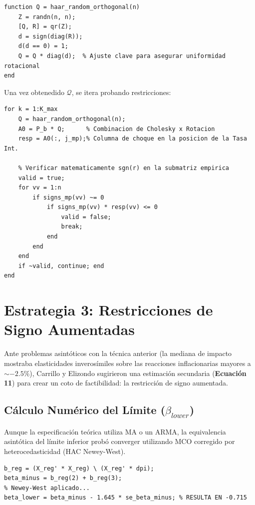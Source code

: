 \documentclass[11pt,a4paper]{article}
\begin{document}
\begin{lstlisting}[caption={Función de Generación bajo Medida de Haar}]
function Q = haar_random_orthogonal(n)
    Z = randn(n, n);
    [Q, R] = qr(Z);
    d = sign(diag(R));
    d(d == 0) = 1;
    Q = Q * diag(d);  % Ajuste clave para asegurar uniformidad rotacional
end
\end{lstlisting}

Una vez obtenedido $\mathcal{Q}$, se itera probando restricciones:

\begin{lstlisting}[caption={Restricción Lógica de Signos (Algoritmo 1 - Paso 5)}]
for k = 1:K_max
    Q = haar_random_orthogonal(n);
    A0 = P_b * Q;      % Combinacion de Cholesky x Rotacion
    resp = A0(:, j_mp);% Columna de choque en la posicion de la Tasa Int.
    
    % Verificar matematicamente sgn(r) en la submatriz empirica
    valid = true;
    for vv = 1:n
        if signs_mp(vv) ~= 0
            if signs_mp(vv) * resp(vv) <= 0
                valid = false;
                break;
            end
        end
    end
    if ~valid, continue; end
end
\end{lstlisting}

\section{Estrategia 3: Restricciones de Signo Aumentadas}
Ante problemas asintóticos con la técnica anterior (la mediana de impacto mostraba elasticidades inverosímiles sobre las reacciones inflacionarias mayores a $\sim -2.5\%$), Carrillo y Elizondo sugirieron una estimación secundaria (\textbf{Ecuación 11}) para crear un coto de factibilidad: la restricción de signo aumentada.

\subsection{Cálculo Numérico del Límite ($\beta_{lower}$)}
Aunque la especificación teórica utiliza MA o un ARMA, la equivalencia asintótica del límite inferior probó converger utilizando MCO corregido por heterocedasticidad (HAC Newey-West).

\begin{lstlisting}[caption={Evolución empírica del límite}]
% Estimacion del limite en MATLAB
b_reg = (X_reg' * X_reg) \ (X_reg' * dpi);
beta_minus = b_reg(2) + b_reg(3);
% Newey-West aplicado...
beta_lower = beta_minus - 1.645 * se_beta_minus; % RESULTA EN -0.715
\end{lstlisting}
\end{document}
